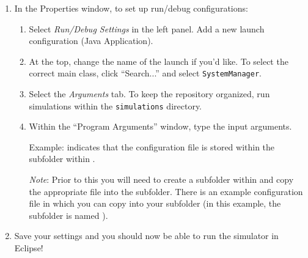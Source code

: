 \documentclass[11pt]{article}
\begin{document}
\begin{enumerate}
\begin{enumerate}
\end{enumerate}

\item In the Properties window, to set up run/debug configurations:

\begin{enumerate}
\item Select \emph{Run/Debug Settings} in the left panel. Add a new launch configuration (Java Application).

\item At the top, change the name of the launch if you'd like. To select the correct main class, click ``Search...'' and select \verb|SystemManager|.

\item Select the \emph{Arguments} tab. To keep the repository organized, run simulations within the \verb|simulations| directory.


\item Within the ``Program Arguments'' window, type the input arguments.

Example:   indicates that the configuration file is stored within the subfolder  within .

\emph{Note}: Prior to this you will need to create a subfolder within  and copy the appropriate  file into the subfolder. There is an example configuration file in  which you can copy into your subfolder (in this example, the subfolder is named ).

\end{enumerate}

\item Save your settings and you should now be able to run the simulator in Eclipse!

\end{enumerate}
\end{document}
